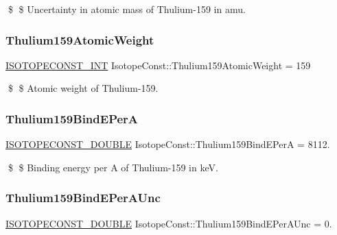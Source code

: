 \$ \$ Uncertainty in atomic mass of Thulium-\/159 in amu. \mbox{\label{group___isotope_const-_thulium-_tm159_ga66c95f5d09ec0944936a9a97a312cea8}} 
\subsubsection{\texorpdfstring{Thulium159\+Atomic\+Weight}{Thulium159AtomicWeight}}
{\footnotesize\ttfamily \mbox{\hyperlink{group___isotope_const-_macros_ga5f18360b3e99483a35c32d789e62621c}{I\+S\+O\+T\+O\+P\+E\+C\+O\+N\+S\+T\+\_\+\+I\+NT}} Isotope\+Const\+::\+Thulium159\+Atomic\+Weight = 159}

\$ \$ Atomic weight of Thulium-\/159. \mbox{\label{group___isotope_const-_thulium-_tm159_gae095a1b2c36952a678dc69044ee07cf6}} 
\subsubsection{\texorpdfstring{Thulium159\+Bind\+E\+PerA}{Thulium159BindEPerA}}
{\footnotesize\ttfamily \mbox{\hyperlink{group___isotope_const-_macros_ga8f45a7272ce02c0b4c65c44636ed719a}{I\+S\+O\+T\+O\+P\+E\+C\+O\+N\+S\+T\+\_\+\+D\+O\+U\+B\+LE}} Isotope\+Const\+::\+Thulium159\+Bind\+E\+PerA = 8112.}

\$ \$ Binding energy per A of Thulium-\/159 in keV. \mbox{\label{group___isotope_const-_thulium-_tm159_ga002e3e5fb1b2b066ca5bc0592c76ba13}} 
\subsubsection{\texorpdfstring{Thulium159\+Bind\+E\+Per\+A\+Unc}{Thulium159BindEPerAUnc}}
{\footnotesize\ttfamily \mbox{\hyperlink{group___isotope_const-_macros_ga8f45a7272ce02c0b4c65c44636ed719a}{I\+S\+O\+T\+O\+P\+E\+C\+O\+N\+S\+T\+\_\+\+D\+O\+U\+B\+LE}} Isotope\+Const\+::\+Thulium159\+Bind\+E\+Per\+A\+Unc = 0.}

